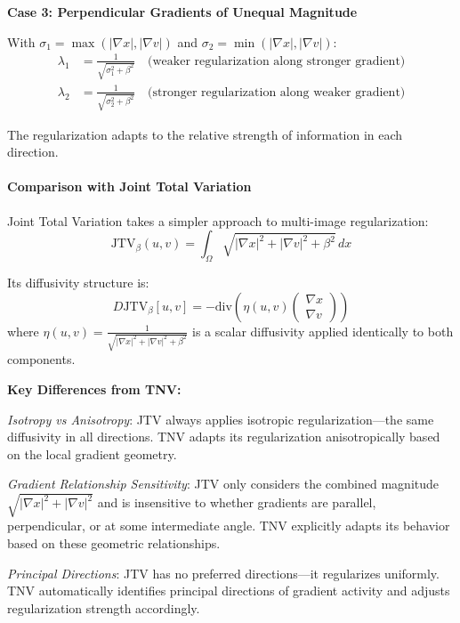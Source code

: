 \textbf{Case 3: Perpendicular Gradients of Unequal Magnitude}

With $\sigma_1 = \max(|\nabla x|, |\nabla v|)$ and $\sigma_2 = \min(|\nabla x|, |\nabla v|)$:
\begin{align}
\lambda_1 &= \frac{1}{\sqrt{\sigma_1^2 + \beta^2}} \quad \text{(weaker regularization along stronger gradient)} \\
\lambda_2 &= \frac{1}{\sqrt{\sigma_2^2 + \beta^2}} \quad \text{(stronger regularization along weaker gradient)}
\end{align}

The regularization adapts to the relative strength of information in each direction.

\paragraph{Comparison with Joint Total Variation}

Joint Total Variation takes a simpler approach to multi-image regularization:
\begin{equation}
\text{JTV}_\beta(u,v) = \int_\Omega \sqrt{|\nabla x|^2 + |\nabla v|^2 + \beta^2} \, dx
\end{equation}

Its diffusivity structure is:
\begin{equation}
D\text{JTV}_\beta[u,v] = -\text{div}\left(\eta(u,v) \begin{pmatrix} \nabla x \\ \nabla v \end{pmatrix}\right)
\end{equation}
where $\eta(u,v) = \frac{1}{\sqrt{|\nabla x|^2 + |\nabla v|^2 + \beta^2}}$ is a scalar diffusivity applied identically to both components.

\textbf{Key Differences from TNV:}

\emph{Isotropy vs Anisotropy}: JTV always applies isotropic regularization---the same diffusivity in all directions. TNV adapts its regularization anisotropically based on the local gradient geometry.

\emph{Gradient Relationship Sensitivity}: JTV only considers the combined magnitude $\sqrt{|\nabla x|^2 + |\nabla v|^2}$ and is insensitive to whether gradients are parallel, perpendicular, or at some intermediate angle. TNV explicitly adapts its behavior based on these geometric relationships.

\emph{Principal Directions}: JTV has no preferred directions---it regularizes uniformly. TNV automatically identifies principal directions of gradient activity and adjusts regularization strength accordingly.

